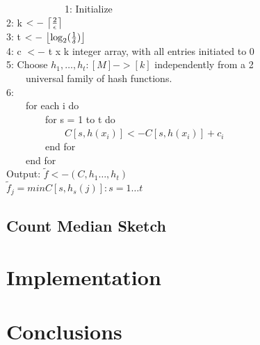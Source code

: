 \documentclass[]{report}
\DeclarePairedDelimiter\ceil{\lceil}{\rceil}
\DeclarePairedDelimiter\floor{\lfloor}{\rfloor}
\begin{document}
\ \ \ \ \ \ \ \ \ \ \ \ 1: Initialize\\

2: k $<-\ \ceil*{\frac{2}{\epsilon}}$\\

3: t $<-\ \floor*{\log_2(\frac{1}{\delta})}$\\

4: c $<-$ t x k integer array, with all entries initiated to 0\\

5: Choose $h_1, \hdots, h_t: [M] -> [k]$ independently from a 2\\

\ \ \ \ universal family of hash functions.\\

6: \\

\ \ \ \ for each i do\\

\ \ \ \ \ \ \ \ for s = 1 to t do\\
	
\ \ \ \ \ \ \ \ \ \ \ \ $C[s, h(x_i)] <- C[s, h(x_i)] + c_i$\\
		
\ \ \ \ \ \ \ \ end for\\
	
\ \ \ \ end for\\

Output: $ \tilde{f} <- (C, h_1 \hdots, h_t)$\\

$\tilde{f}_j = min{C[s, h_s(j)] : s = 1 \hdots t}$\\



 


\section{Count Median Sketch}   



\chapter{Implementation}                



\chapter{Conclusions}                

      


\begin{thebibliography}{9}
\end{thebibliography}
\end{document}
